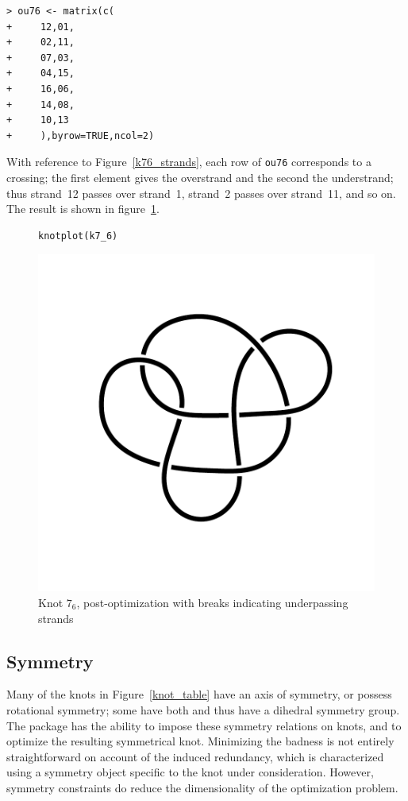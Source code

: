 \documentclass{birkjour}
\theoremstyle{definition}
\theoremstyle{remark}
\numberwithin{equation}{section}
\begin{document}
\begin{verbatim}
> ou76 <- matrix(c(
+     12,01,
+     02,11,
+     07,03,
+     04,15,
+     16,06,
+     14,08,
+     10,13
+     ),byrow=TRUE,ncol=2)
\end{verbatim}

With reference to Figure~\ref{k76_strands}, each row of {\tt ou76}
corresponds to a crossing; the first element gives the overstrand and
the second the understrand; thus strand~12 passes over strand~1,
strand~2 passes over strand~11, and so on. The result is shown in
figure~\ref{76_overunder}.

  
\begin{figure}[!tbp]
\begin{verbatim}
knotplot(k7_6)
\end{verbatim}
  \centering
\includegraphics[scale = 0.9]{knot-009}
\caption{Knot $7_6$, post-optimization with breaks indicating
  \label{76_overunder}  underpassing strands}
\end{figure}


\subsection{Symmetry}

Many of the knots in Figure~\ref{knot_table} have an axis of symmetry,
or possess rotational symmetry; some have both and thus have a
dihedral symmetry group.  The package has the ability to impose these
symmetry relations on knots, and to optimize the resulting symmetrical
knot.  Minimizing the badness is not entirely straightforward on
account of the induced redundancy, which is characterized using a
symmetry object specific to the knot under consideration.  However,
symmetry constraints do reduce the dimensionality of the optimization
problem.
\end{document}
